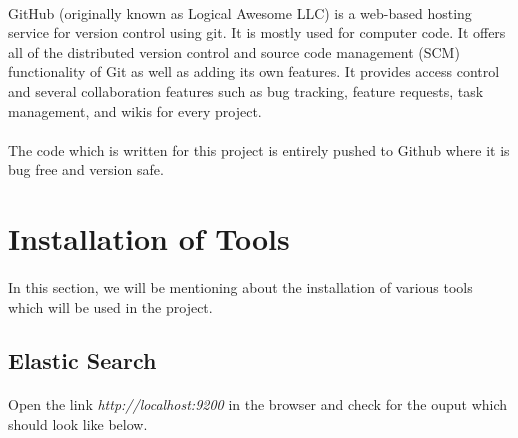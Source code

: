 \documentclass{report}
\begin{document}
\paragraph{}
GitHub (originally known as Logical Awesome LLC) is a web-based hosting service for version control using git. It is mostly used for computer code. It offers all of the distributed version control and source code management (SCM) functionality of Git as well as adding its own features. It provides access control and several collaboration features such as bug tracking, feature requests, task management, and wikis for every project.

\paragraph{}
The code which is written for this project is entirely pushed to Github where it is bug free and version safe.

\section{Installation of Tools}
\paragraph{}
In this section, we will be mentioning about the installation of various tools which will be used in the project.

\subsection{Elastic Search}


\paragraph{}
Open the link \textit{http://localhost:9200} in the browser and check for the ouput which should look like below.
\end{document}
